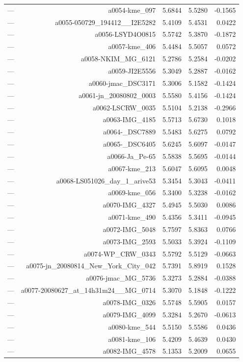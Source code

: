 \begin{table}[htbp]
\begin{tabular}{lrrrr}
— & a0054-kme_097 & 5.6844 & 5.5280 & -0.1565 \\
— & a0055-050729_194412__I2E5282 & 5.4109 & 5.4531 & 0.0422 \\
— & a0056-LSYD4O0815 & 5.5742 & 5.3870 & -0.1872 \\
— & a0057-kme_406 & 5.4484 & 5.5057 & 0.0572 \\
— & a0058-NKIM_MG_6121 & 5.2786 & 5.2584 & -0.0202 \\
— & a0059-JI2E5556 & 5.3049 & 5.2887 & -0.0162 \\
— & a0060-jmac_DSC3171 & 5.3006 & 5.1582 & -0.1424 \\
— & a0061-jn_20080802_0003 & 5.5580 & 5.4156 & -0.1424 \\
— & a0062-LSCRW_0035 & 5.5104 & 5.2138 & -0.2966 \\
— & a0063-IMG_4185 & 5.5713 & 5.6730 & 0.1018 \\
— & a0064-_DSC7889 & 5.5483 & 5.6275 & 0.0792 \\
— & a0065-_DSC6405 & 5.6245 & 5.6097 & -0.0147 \\
— & a0066-Ja_Pe-65 & 5.5838 & 5.5695 & -0.0144 \\
— & a0067-kme_213 & 5.6047 & 5.6095 & 0.0048 \\
— & a0068-LS051026_day_1_arive53 & 5.3454 & 5.3043 & -0.0411 \\
— & a0069-kme_056 & 5.3400 & 5.3238 & -0.0162 \\
— & a0070-IMG_4327 & 5.4945 & 5.5030 & 0.0086 \\
— & a0071-kme_490 & 5.4356 & 5.3411 & -0.0945 \\
— & a0072-IMG_5048 & 5.7597 & 5.8363 & 0.0766 \\
— & a0073-IMG_2593 & 5.5033 & 5.3924 & -0.1109 \\
— & a0074-WP_CRW_0343 & 5.5792 & 5.5129 & -0.0663 \\
— & a0075-jn_20080814_New_York_City_042 & 5.7391 & 5.8919 & 0.1528 \\
— & a0076-jmac_MG_5736 & 5.3273 & 5.2884 & -0.0388 \\
— & a0077-20080627_at_14h31m24__MG_0714 & 5.3070 & 5.1848 & -0.1222 \\
— & a0078-IMG_0326 & 5.5748 & 5.5905 & 0.0157 \\
— & a0079-IMG_4099 & 5.3284 & 5.2670 & -0.0613 \\
— & a0080-kme_544 & 5.5150 & 5.5586 & 0.0436 \\
— & a0081-kme_106 & 5.4209 & 5.4639 & 0.0430 \\
— & a0082-IMG_4578 & 5.1353 & 5.2009 & 0.0655 \\

\end{tabular}
\end{table}

